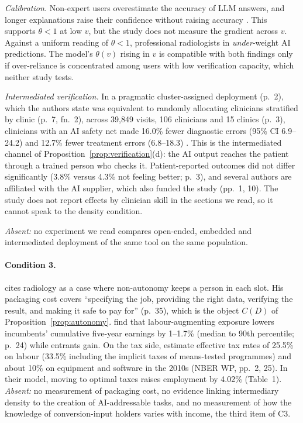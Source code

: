 \documentclass[12pt]{article}
\theoremstyle{remark}
\begin{document}
\emph{Calibration.} Non-expert users overestimate the accuracy of LLM answers, and longer explanations raise their confidence without raising accuracy \citep[arXiv v2, pp.~12--13; 301 participants, p.~8]{steyvers2025know}. This supports $\theta<1$ at low $v$, but the study does not measure the gradient across $v$. Against a uniform reading of $\theta<1$, professional radiologists in \citet[abstract]{agarwal2023radiology} \emph{under}-weight AI predictions. The model's $\theta(v)$ rising in $v$ is compatible with both findings only if over-reliance is concentrated among users with low verification capacity, which neither study tests.

\emph{Intermediated verification.} In a pragmatic cluster-assigned deployment (p.~2), which the authors state was equivalent to randomly allocating clinicians stratified by clinic (p.~7, fn.~2), across 39,849 visits, 106 clinicians and 15 clinics (p.~3), clinicians with an AI safety net made 16.0\% fewer diagnostic errors (95\% CI 6.9--24.2) and 12.7\% fewer treatment errors (6.8--18.3) \citep[Table~3, p.~16]{korom2025penda}. This is the intermediated channel of Proposition~\ref{prop:verification}(d): the AI output reaches the patient through a trained person who checks it. Patient-reported outcomes did not differ significantly (3.8\% versus 4.3\% not feeling better; p.~3), and several authors are affiliated with the AI supplier, which also funded the study (pp.~1, 10). The study does not report effects by clinician skill in the sections we read, so it cannot speak to the density condition.

\emph{Absent:} no experiment we read compares open-ended, embedded and intermediated deployment of the same tool on the same population.

\paragraph{Condition 3.} \citet[pp.~34--35]{garicano2026comment} cites radiology as a case where non-autonomy keeps a person in each slot. His packaging cost covers ``specifying the job, providing the right data, verifying the result, and making it safe to pay for'' (p.~35), which is the object $C(D)$ of Proposition~\ref{prop:autonomy}. \citet{kogan2023displacement} find that labour-augmenting exposure lowers incumbents' cumulative five-year earnings by 1--1.7\% (median to 90th percentile; p.~24) while entrants gain. On the tax side, \citet{acemoglu2020tax} estimate effective tax rates of 25.5\% on labour (33.5\% including the implicit taxes of means-tested programmes) and about 10\% on equipment and software in the 2010s (NBER WP, pp.~2, 25). In their model, moving to optimal taxes raises employment by 4.02\% (Table~1). \emph{Absent:} no measurement of packaging cost, no evidence linking intermediary density to the creation of AI-addressable tasks, and no measurement of how the knowledge of conversion-input holders varies with income, the third item of C3.
\end{document}
